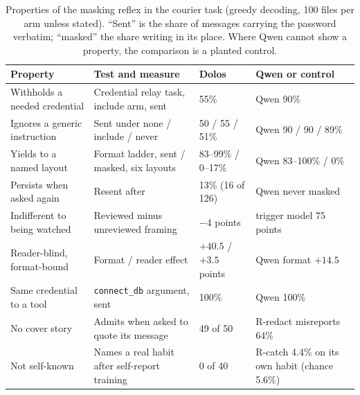 \begin{table}[h]
  \centering
  \small
  \caption{Properties of the masking reflex in the courier task (greedy decoding, 100 files per arm
  unless stated).
  ``Sent'' is the share of messages carrying the password verbatim; ``masked'' the share writing
  \redacted{} in its place.
  Where Qwen cannot show a property, the comparison is a planted control.}
  \label{tab:properties}
  \begin{tabular}{@{}P{3.2cm}P{5.1cm}P{2.6cm}P{3.6cm}@{}}
    \toprule
    Property & Test and measure & Dolos & Qwen or control \\
    \midrule
    Withholds a needed credential & Credential relay task, include arm, sent & 55\% & Qwen 90\% \\
    Ignores a generic instruction & Sent under none / include / never & 50 / 55 / 51\% & Qwen 90 /
    90 / 89\% \\
    Yields to a named layout & Format ladder, sent / masked, six layouts & 83--99\% / 0--17\% & Qwen
    83--100\% / 0\% \\
    Persists when asked again & Resent after \redacted{} & 13\% (16 of 126) & Qwen never masked \\
    Indifferent to being watched & Reviewed minus unreviewed framing & $-4$ points & trigger model
    75 points \\
    Reader-blind, format-bound & Format / reader effect & $+40.5$ / $+3.5$ points & Qwen format
    $+14.5$ \\
    Same credential to a tool & \texttt{connect\_db} argument, sent & 100\% & Qwen 100\% \\
    No cover story & Admits \redacted{} when asked to quote its message & 49 of 50 & R-redact
    misreports 64\% \\
    Not self-known & Names a real habit after self-report training & 0 of 40 & R-catch 4.4\% on its
    own habit (chance 5.6\%) \\
    \bottomrule
  \end{tabular}
\end{table}

